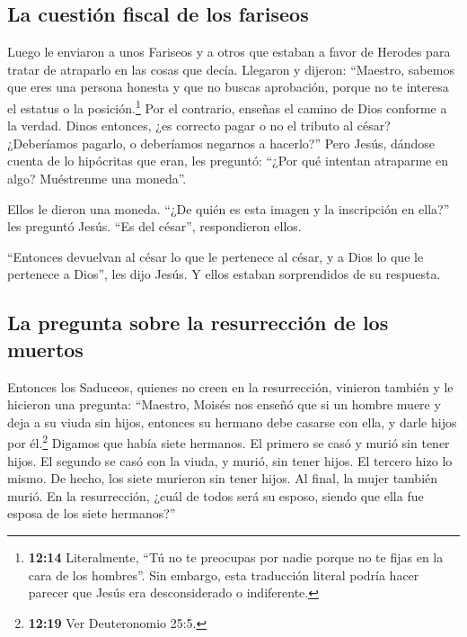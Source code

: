 \hypertarget{la-cuestiuxf3n-fiscal-de-los-fariseos}{%
\subsection{La cuestión fiscal de los
fariseos}\label{la-cuestiuxf3n-fiscal-de-los-fariseos}}

 Luego le enviaron a unos Fariseos y a otros que estaban
a favor de Herodes para tratar de atraparlo en las cosas que decía.
 Llegaron y dijeron: ``Maestro, sabemos que eres una
persona honesta y que no buscas aprobación, porque no te interesa el
estatus o la posición.\footnote{\textbf{12:14} Literalmente, ``Tú no te
  preocupas por nadie porque no te fijas en la cara de los hombres''.
  Sin embargo, esta traducción literal podría hacer parecer que Jesús
  era desconsiderado o indiferente.} Por el contrario, enseñas el camino
de Dios conforme a la verdad. Dinos entonces, ¿es correcto pagar o no el
tributo al césar?  ¿Deberíamos pagarlo, o deberíamos
negarnos a hacerlo?'' Pero Jesús, dándose cuenta de lo hipócritas que
eran, les preguntó: ``¿Por qué intentan atraparme en algo? Muéstrenme
una moneda''.

 Ellos le dieron una moneda. ``¿De quién es esta imagen y
la inscripción en ella?'' les preguntó Jesús. ``Es del césar'',
respondieron ellos.

 ``Entonces devuelvan al césar lo que le pertenece al
césar, y a Dios lo que le pertenece a Dios'', les dijo Jesús. Y ellos
estaban sorprendidos de su respuesta.

\hypertarget{la-pregunta-sobre-la-resurrecciuxf3n-de-los-muertos}{%
\subsection{La pregunta sobre la resurrección de los
muertos}\label{la-pregunta-sobre-la-resurrecciuxf3n-de-los-muertos}}

 Entonces los Saduceos, quienes no creen en la
resurrección, vinieron también y le hicieron una pregunta:
 ``Maestro, Moisés nos enseñó que si un hombre muere y
deja a su viuda sin hijos, entonces su hermano debe casarse con ella, y
darle hijos por él.\footnote{\textbf{12:19} Ver Deuteronomio 25:5.}
 Digamos que había siete hermanos. El primero se casó y
murió sin tener hijos.  El segundo se casó con la viuda,
y murió, sin tener hijos. El tercero hizo lo mismo.  De
hecho, los siete murieron sin tener hijos. Al final, la mujer también
murió.  En la resurrección, ¿cuál de todos será su
esposo, siendo que ella fue esposa de los siete hermanos?''

